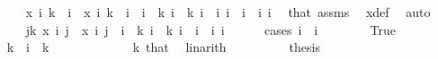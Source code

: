 \begin{isabellebody}
\ \ \ \ \isamarkupfalse%
\ {\isacharasterisk}{\kern0pt}{\isacharcolon}{\kern0pt}{\isachardoublequoteopen}x\ i{}\ {\isacharparenleft}{\kern0pt}k\ {\isacharminus}{\kern0pt}\ i{}{\isacharparenright}{\kern0pt}\ {\isasymnoteq}\ x\ i{}\ {\isacharparenleft}{\kern0pt}k\ {\isacharminus}{\kern0pt}\ i{}{\isacharparenright}{\kern0pt}{\isachardoublequoteclose}\ \ {\isachardoublequoteopen}i{}\ {\isasymle}\ k{\isachardoublequoteclose}\ {\isachardoublequoteopen}i{}\ {\isasymle}\ k{\isachardoublequoteclose}\ {\isachardoublequoteopen}i{}\ {\isasymnoteq}\ i{}{\isachardoublequoteclose}\ {\isachardoublequoteopen}i{}\ {\isacharless}{\kern0pt}\ i{}{\isachardoublequoteclose}\ \ i{}\ i{}\ \isamarkupfalse%
\ that\ assms{\isacharparenleft}{\kern0pt}{}{\isacharparenright}{\kern0pt}\ \isamarkupfalse%
\ x{\isacharunderscore}{\kern0pt}def\ \isamarkupfalse%
\ auto\ \isanewline
\ \ \ \ \isamarkupfalse%
\ {\isachardoublequoteopen}{\isasymexists}j{\isacharless}{\kern0pt}k{\isachardot}{\kern0pt}\ x\ i{}\ j\ {\isasymnoteq}\ x\ i{}\ j{\isachardoublequoteclose}\ \ {\isachardoublequoteopen}i{}\ {\isasymle}\ k{\isachardoublequoteclose}\ {\isachardoublequoteopen}i{}\ {\isasymle}\ k{\isachardoublequoteclose}\ {\isachardoublequoteopen}i{}\ {\isasymnoteq}\ i{}{\isachardoublequoteclose}\ \ i{}\ i{}\isanewline
\ \ \ \ \isamarkupfalse%
\ {\isacharparenleft}{\kern0pt}cases\ {\isachardoublequoteopen}i{}\ {\isasymle}\ i{}{\isachardoublequoteclose}{\isacharparenright}{\kern0pt}\isanewline
\ \ \ \ \ \ \isamarkupfalse%
\ True\isanewline
\ \ \ \ \ \ \isamarkupfalse%
\ \isamarkupfalse%
\ {\isachardoublequoteopen}k\ {\isacharminus}{\kern0pt}\ i{}\ {\isacharless}{\kern0pt}\ k{\isachardoublequoteclose}\ \isanewline
\ \ \ \ \ \ \ \ \isamarkupfalse%
\ {\isacartoucheopen}{}\ {\isacharless}{\kern0pt}\ k{\isacartoucheclose}\ that{\isacharparenleft}{\kern0pt}{}{\isacharparenright}{\kern0pt}\ \isamarkupfalse%
\ linarith\isanewline
\ \ \ \ \ \ \isamarkupfalse%
\ \isamarkupfalse%
\ {\isacharquery}{\kern0pt}thesis\ \isamarkupfalse%

\end{isabellebody}
